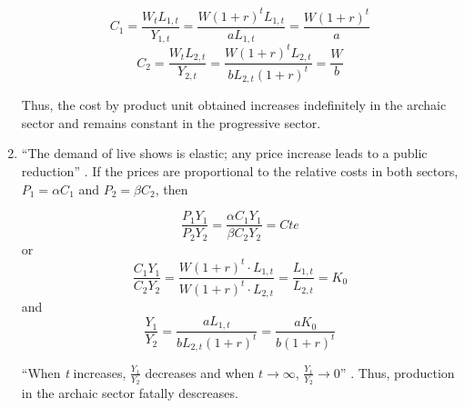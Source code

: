 \documentclass[a4paper, 12pt, openright, oneside, german, french, brazil, english]{abntex2}
\begin{document}
\begin{enumerate}
		$$C_1 = \frac{W_tL_{1,t}}{Y_{1,t}} = \frac{W(1+r)^tL_{1,t}}{aL_{1,t}} = \frac{W(1+r)^t}{a}$$
		$$C_2 = \frac{W_tL_{2,t}}{Y_{2,t}} = \frac{W(1+r)^tL_{2,t}}{bL_{2,t}(1+r)^t} = \frac{W}{b}$$
		
		
		Thus, the cost by product unit obtained increases indefinitely in the archaic sector and remains constant in the progressive sector. 
		
		
		
		
		
		\item ``The demand of live shows is elastic; any price increase leads to a public reduction'' \cite[p. 56]{benhamou2007economia}. If the prices are proportional to the relative costs in both sectors, $P_1 = \alpha C_1$ and $P_2 = \beta C_2$, then
		
		$$\frac{P_1Y_1}{P_2Y_2} = \frac{\alpha C_1Y_1}{\beta C_2Y_2} = Cte$$ or
		$$\frac{C_1Y_1}{C_2Y_2} = \frac{W(1+r)^t \cdot L_{1,t}}{W(1+r)^t \cdot L_{2,t}} = \frac{L_{1,t}}{L_{2,t}} = K_0$$ and
		$$\frac{Y_1}{Y_2} = \frac{aL_{1,t}}{bL_{2,t}(1+r)^t} = \frac{aK_0}{b(1+r)^t}$$
		
	
	``When \textit{t} increases, $\frac{Y_1}{Y_2}$ decreases and when $t \rightarrow \infty$, $\frac{Y_1}{Y_2} \rightarrow 0$'' \cite[p. 57]{benhamou2007economia}. Thus, production in the archaic sector fatally descreases.
	
	\end{enumerate}
	
\end{document}
